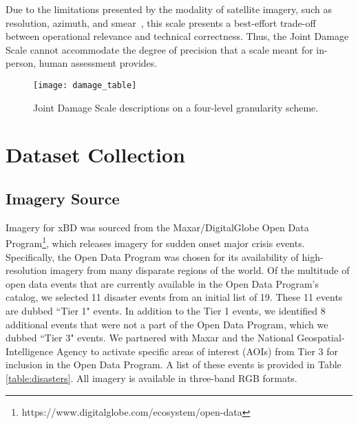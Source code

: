 \documentclass[10pt,twocolumn,letterpaper]{article}
\begin{document}
Due to the limitations presented by the modality of satellite imagery, such as resolution, azimuth, and smear~\cite{wahballahSmearEffectHighresolution2018}, this scale presents a best-effort trade-off between operational relevance and technical correctness. Thus, the Joint Damage Scale cannot accommodate the degree of precision that a scale meant for in-person, human assessment provides.
\begin{figure}[ht]
	\begin{center}
		\texttt{[image: damage\_table]}
	\end{center}
	\caption{Joint Damage Scale descriptions on a four-level granularity scheme.}
	\vspace{-0.5cm}
	\label{table:joint.damage.scale}
\end{figure}

\section{Dataset Collection}
\subsection{Imagery Source}
Imagery for xBD was sourced from the Maxar/DigitalGlobe Open Data Program\footnote{https://www.digitalglobe.com/ecosystem/open-data}, which releases imagery for sudden onset major crisis events.
Specifically, the Open Data Program was chosen for its availability of high-resolution imagery from many disparate regions of the world.
Of the multitude of open data events that are currently available in the Open Data Program's catalog, we selected 11 disaster events from an initial list of 19.
These 11 events are dubbed ``Tier 1" events.
In addition to the Tier 1 events, we identified 8 additional events that were not a part of the Open Data Program, which we dubbed ``Tier 3" events.
We partnered with Maxar and the National Geospatial-Intelligence Agency to activate specific areas of interest (AOIs) from Tier 3 for inclusion in the Open Data Program.
A list of these events is provided in Table \ref{table:disasters}. All imagery is available in three-band RGB formats.
\end{document}
